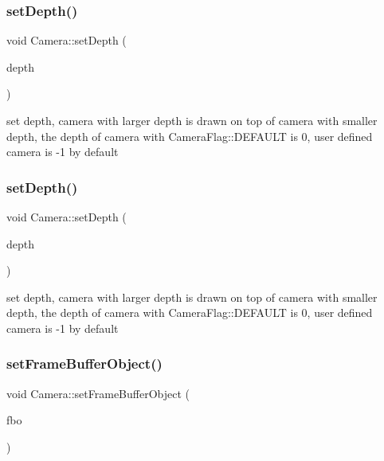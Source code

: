 \subsubsection{\texorpdfstring{set\+Depth()}{setDepth()}\hspace{0.1cm}{\footnotesize\ttfamily [1/2]}}
{\footnotesize\ttfamily void Camera\+::set\+Depth (\begin{DoxyParamCaption}\item[{int8\+\_\+t}]{depth }\end{DoxyParamCaption})}

set depth, camera with larger depth is drawn on top of camera with smaller depth, the depth of camera with Camera\+Flag\+::\+D\+E\+F\+A\+U\+LT is 0, user defined camera is -\/1 by default \mbox{\label{classCamera_a361809c317aebb2785ffbda7836e25ff}} 
\subsubsection{\texorpdfstring{set\+Depth()}{setDepth()}\hspace{0.1cm}{\footnotesize\ttfamily [2/2]}}
{\footnotesize\ttfamily void Camera\+::set\+Depth (\begin{DoxyParamCaption}\item[{int8\+\_\+t}]{depth }\end{DoxyParamCaption})}

set depth, camera with larger depth is drawn on top of camera with smaller depth, the depth of camera with Camera\+Flag\+::\+D\+E\+F\+A\+U\+LT is 0, user defined camera is -\/1 by default \mbox{\label{classCamera_a17b4f5537c83a29f8a7d809859e690a4}} 
\subsubsection{\texorpdfstring{set\+Frame\+Buffer\+Object()}{setFrameBufferObject()}\hspace{0.1cm}{\footnotesize\ttfamily [1/2]}}
{\footnotesize\ttfamily void Camera\+::set\+Frame\+Buffer\+Object (\begin{DoxyParamCaption}\item[{\hyperlink{classexperimental_1_1FrameBuffer}{experimental\+::\+Frame\+Buffer} $\ast$}]{fbo }\end{DoxyParamCaption})}

